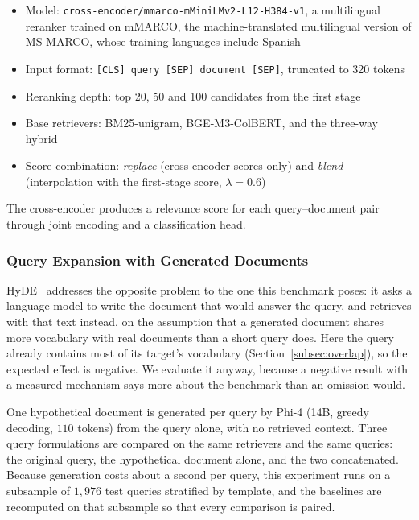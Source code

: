 \documentclass[preprint,12pt]{elsarticle}
\begin{document}
\begin{itemize}
    \item Model: \texttt{cross-encoder/mmarco-mMiniLMv2-L12-H384-v1}, a multilingual reranker trained on mMARCO, the machine-translated multilingual version of MS MARCO, whose training languages include Spanish
    \item Input format: \texttt{[CLS] query [SEP] document [SEP]}, truncated to 320 tokens
    \item Reranking depth: top 20, 50 and 100 candidates from the first stage
    \item Base retrievers: BM25-unigram, BGE-M3-ColBERT, and the three-way hybrid
    \item Score combination: \textit{replace} (cross-encoder scores only) and \textit{blend} (interpolation with the first-stage score, $\lambda = 0.6$)
\end{itemize}

The cross-encoder produces a relevance score for each query--document pair through joint encoding and a classification head.

\subsubsection{Query Expansion with Generated Documents}
\label{subsec:hyde_method}

HyDE~\citep{gao2023precise} addresses the opposite problem to the one this benchmark poses: it asks a language model to write the document that would answer the query, and retrieves with that text instead, on the assumption that a generated document shares more vocabulary with real documents than a short query does. Here the query already contains most of its target's vocabulary (Section~\ref{subsec:overlap}), so the expected effect is negative. We evaluate it anyway, because a negative result with a measured mechanism says more about the benchmark than an omission would.

One hypothetical document is generated per query by Phi-4 (14B, greedy decoding, $110$ tokens) from the query alone, with no retrieved context. Three query formulations are compared on the same retrievers and the same queries: the original query, the hypothetical document alone, and the two concatenated. Because generation costs about a second per query, this experiment runs on a subsample of $1{,}976$ test queries stratified by template, and the baselines are recomputed on that subsample so that every comparison is paired.
\end{document}

